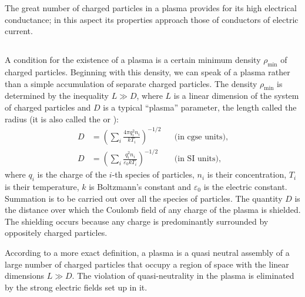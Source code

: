 The great number of charged particles in a plasma provides for its high electrical conductance; in this aspect its properties approach those of conductors of electric current.

\subsection{}\label{22.6.2} A condition for the existence of a plasma is a certain minimum density $\rho_{\text{min}}$ of charged particles. Beginning with this density, we can speak of a plasma rather than a simple accumulation of separate charged particles. The density $\rho_{\text{min}}$ is determined by the inequality $L \gg D$, where $L$ is a linear dimension of the system of charged particles and $D$ is a typical ``plasma'' parameter, the length called the  radius (it is also called the  or ):
\begin{align*}%
D & = \left( \sum_{i} \frac{4 \pi q_{i}^{2}n_{i}}{k T_{i}} \right)^{-1/2} && \text{(in cgse units),}\\
D & = \left( \sum_{i} \frac{ q_{i}^{2}n_{i}}{\varepsilon_{0} k T_{i}} \right)^{-1/2} && \text{(in SI units),}
\end{align*}
where $q_{i}$ is the charge of the $i$-th species of particles, $n_{i}$ is their concentration, $T_{i}$ is their temperature, $k$ is Boltzmann's constant  and $\varepsilon_{0}$ is the electric constant. Summation is to be carried out over all the species of particles. The quantity $D$ is the distance over which the Coulomb field of any charge of the plasma is shielded. The shielding occurs because any charge is predominantly surrounded by oppositely charged particles. 

According to a more exact definition, a plasma is a quasi­ neutral assembly of a large number of charged particles that occupy a region of space with the linear dimensions $L \gg D$. The violation of quasi-neutrality in the plasma is eliminated by the strong electric fields set up in it. 

